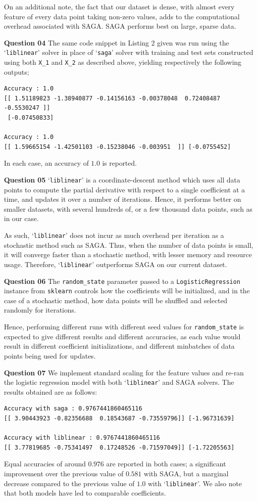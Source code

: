 \documentclass{article}[a4paper]
\begin{document}
	On an additional note, the fact that our dataset is dense, with almost every feature of every data point taking non-zero values, adds to the computational overhead associated with SAGA. SAGA performs best on large, sparse data.
	\medskip
	
	\textbf{Question 04} The same code snippet in Listing 2 given was run using the `\texttt{liblinear}' solver in place of `\texttt{saga}' solver with training and test sets constructed using both \texttt{X\_1} and \texttt{X\_2} as described above, yielding respectively the following outputs;
	\begin{verbatim}
Accuracy : 1.0
[[ 1.51189823 -1.38940877 -0.14156163 -0.00378048  0.72408487 -0.5530247 ]]
 [-0.07450833]

Accuracy : 1.0
[[ 1.59665154 -1.42501103 -0.15238046 -0.003951  ]] [-0.0755452]
\end{verbatim}
	In each case, an accuracy of $1.0$ is reported.
	\medskip

	\textbf{Question 05} `\texttt{liblinear}' is a coordinate-descent method which uses all data points to compute the partial derivative with respect to a single coefficient at a time, and updates it over a number of iterations. Hence, it performs better on smaller datasets, with several hundreds of, or a few thousand data points, such as in our case.

	As such, `\texttt{liblinear}' does not incur as much overhead per iteration as a stochastic method such as SAGA. Thus, when the number of data points is small, it will converge faster than a stochastic method, with lesser memory and resource usage. Therefore, `\texttt{liblinear}' outperforms SAGA on our current dataset.
	\medskip

	\textbf{Question 06} The \texttt{random\_state} parameter passed to a \texttt{LogisticRegression} instance from \texttt{sklearn} controls how the coefficients will be initialized, and in the case of a stochastic method, how data points will be shuffled and selected randomly for iterations.

	Hence, performing different runs with different seed values for \texttt{random\_state} is expected to give different results and different accuracies, as each value would result in different coefficient initializations, and different minbatches of data points being used for updates.
	\medskip

	\textbf{Question 07} We implement standard scaling for the feature values and re-ran the logistic regression model with both `\texttt{liblinear}' and SAGA solvers. The results obtained are as follows:
	\begin{verbatim}
Accuracy with saga : 0.9767441860465116
[[ 3.90443923 -0.82356688  0.18543687 -0.73559796]] [-1.96731639]

Accuracy with liblinear : 0.9767441860465116
[[ 3.77819685 -0.75341497  0.17248526 -0.71597049]] [-1.72205563]
\end{verbatim}
	Equal accuracies of around $0.976$ are reported in both cases; a significant improvement over the previous value of $0.581$ with SAGA, but a marginal decrease compared to the previous value of $1.0$ with `\texttt{liblinear}'. We also note that both models have led to comparable coefficients.
\end{document}
